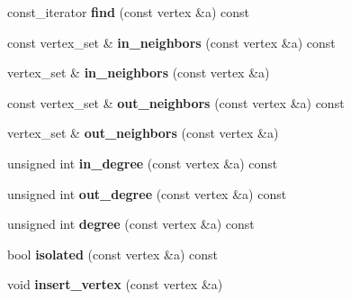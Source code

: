 \begin{DoxyCompactItemize}
\item 
\mbox{\label{class_n_graph_1_1t_graph_a15801328dc81c8eff05ce09dd4094b28}} 
const\+\_\+iterator {\bfseries find} (const vertex \&a) const
\item 
\mbox{\label{class_n_graph_1_1t_graph_a58f5d07e8dfe45d237d093c5bc11ad53}} 
const vertex\+\_\+set \& {\bfseries in\+\_\+neighbors} (const vertex \&a) const
\item 
\mbox{\label{class_n_graph_1_1t_graph_a0ca32078d83236c669a6e0beb7d93759}} 
vertex\+\_\+set \& {\bfseries in\+\_\+neighbors} (const vertex \&a)
\item 
\mbox{\label{class_n_graph_1_1t_graph_acffca17cd25301de3d6aa8a132c4431f}} 
const vertex\+\_\+set \& {\bfseries out\+\_\+neighbors} (const vertex \&a) const
\item 
\mbox{\label{class_n_graph_1_1t_graph_acb50f260b7b391b7c6a73a640bacc08d}} 
vertex\+\_\+set \& {\bfseries out\+\_\+neighbors} (const vertex \&a)
\item 
\mbox{\label{class_n_graph_1_1t_graph_a1e6a83e13c11c16599567f6d50e658c2}} 
unsigned int {\bfseries in\+\_\+degree} (const vertex \&a) const
\item 
\mbox{\label{class_n_graph_1_1t_graph_afa6b411ff31557d044b02f87bbe50999}} 
unsigned int {\bfseries out\+\_\+degree} (const vertex \&a) const
\item 
\mbox{\label{class_n_graph_1_1t_graph_a717a15800fec8ebefde8d2d853390a0b}} 
unsigned int {\bfseries degree} (const vertex \&a) const
\item 
\mbox{\label{class_n_graph_1_1t_graph_a0352a3bfc0fc6d2ce59395d1f0064550}} 
bool {\bfseries isolated} (const vertex \&a) const
\item 
\mbox{\label{class_n_graph_1_1t_graph_ae7e728e1249dc0fcb4e2ebec1e4ae6dd}} 
void {\bfseries insert\+\_\+vertex} (const vertex \&a)
\item 

\end{DoxyCompactItemize}
